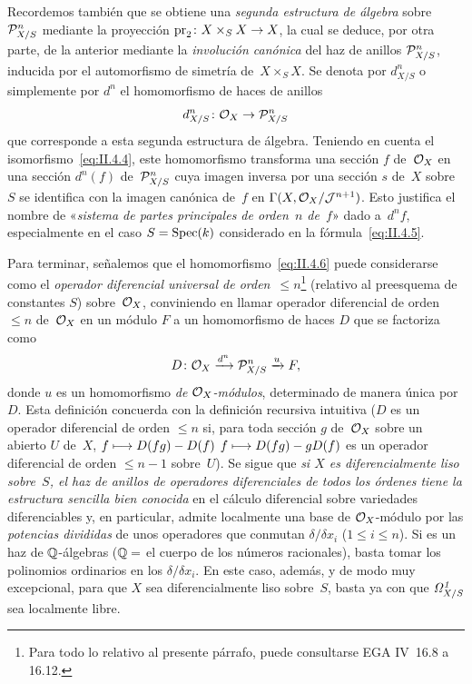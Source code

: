 \begin{remarques}
Recordemos también que se obtiene una \emph{segunda estructura de álgebra} sobre~$\cal{P}_{X/S}^n$ mediante la proyección $\pr_2\colon X\times_S X\to X$, la cual se deduce, por otra parte, de la anterior mediante la \emph{involución canónica} del haz de anillos $\cal{P}_{X/S}^n$, inducida por el automorfismo de simetría de~$X\times_S X$. Se denota por $d_{X/S}^n$
\label{indnot:bb}%
o simplemente por $d^n$ el homomorfismo de haces de anillos
\begin{equation}
\label{eq:II.4.6}
d_{X/S}^n\colon\cal{O}_X\to\cal{P}_{X/S}^n
\end{equation}
que corresponde a esta segunda estructura de álgebra. Teniendo en cuenta el isomorfismo~\eqref{eq:II.4.4}, este homomorfismo transforma una sección $f$ de~$\cal{O}_X$ en una sección $d^n(f)$ de~$\cal{P}_{X/S}^n$ cuya imagen inversa por una sección $s$ de~$X$ sobre~$S$ se identifica con la imagen canónica de~$f$ en $\Gamma(X,\cal{O}_X/\cal{J}^{n+1})$. Esto justifica el nombre de «\emph{sistema de partes principales de orden~$n$ de~$f$}»
%
dado a~$d^nf$,
especialmente en el caso $S=\Spec(k)$ considerado en la fórmula~\eqref{eq:II.4.5}.

Para terminar, señalemos que el homomorfismo~\eqref{eq:II.4.6} puede considerarse como el \emph{operador diferencial universal de orden}~$\leq n$\kern1pt\footnote{Para todo lo relativo al presente párrafo, puede consultarse EGA IV~16.8 a 16.12.} (relativo al preesquema de constantes $S$) sobre~$\cal{O}_X$, conviniendo en llamar operador diferencial de orden~$\leq n$
%
%
de~$\cal{O}_X$ en un módulo $F$ a un homomorfismo de haces $D$ que se factoriza como
\[
D\colon\cal{O}_X\lto{d^n}\cal{P}_{X/S}^n\lto{u}F,
\]
donde $u$ es un homomorfismo \emph{de $\cal{O}_X$-módulos}, determinado de manera única por~$D$. Esta definición concuerda con la definición recursiva intuitiva ($D$ es un operador diferencial de orden $\leq n$ si, para toda sección $g$ de~$\cal{O}_X$ sobre un abierto $U$ de~$X$,
{$f\mto D(fg)-D(f)$}
{$f\mto D(fg)-gD(f)$}
es un operador diferencial de orden $\leq n-1$ sobre~$U$). Se sigue que \emph{si $X$ es diferencialmente liso sobre~$S$, el haz de anillos de operadores diferenciales de todos los órdenes tiene la estructura sencilla bien conocida} en el cálculo diferencial sobre variedades diferenciables y, en particular, admite localmente una base de $\cal{O}_X$-módulo
por las \emph{potencias divididas} de unos operadores que conmutan $\delta/\delta x_i$ ($1\leq i\leq n$). Si
es un haz de $\QQ$-álgebras ($\QQ=$ el cuerpo de los números racionales), basta tomar los polinomios ordinarios en los $\delta/\delta x_i$. En este caso, además, y de modo muy excepcional, para que $X$ sea diferencialmente liso sobre~$S$, basta ya con que $\it{\Omega}_{X/S}^1$ sea localmente libre.
\end{remarques}

